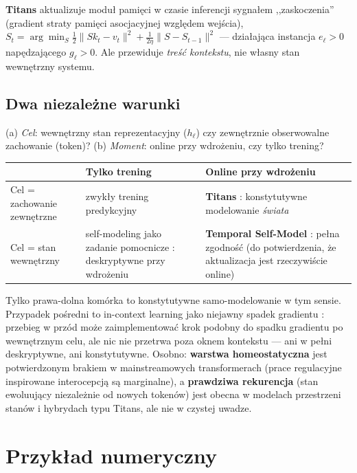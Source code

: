 \documentclass[11pt]{article}
\begin{document}
\textbf{Titans} \cite{behrouz2024} aktualizuje moduł pamięci w czasie inferencji sygnałem ,,zaskoczenia'' (gradient straty pamięci asocjacyjnej względem wejścia), $S_t=\arg\min_S\frac12\|Sk_t-v_t\|^2+\frac1{2\eta}\|S-S_{t-1}\|^2$ --- działająca instancja $e_\ell>0$ napędzającego $g_\ell>0$. Ale przewiduje \emph{treść kontekstu}, nie własny stan wewnętrzny systemu.

\subsection*{Dwa niezależne warunki}
(a) \emph{Cel}: wewnętrzny stan reprezentacyjny ($h_\ell$) czy zewnętrznie obserwowalne zachowanie (token)? (b) \emph{Moment}: online przy wdrożeniu, czy tylko trening?

\begin{center}
\small
\begin{tabular}{@{}>{\raggedright}p{2.6cm}>{\raggedright}p{4.5cm}>{\raggedright\arraybackslash}p{4.5cm}@{}}
\toprule
 & \textbf{Tylko trening} & \textbf{Online przy wdrożeniu} \\
\midrule
Cel = zachowanie zewnętrzne & zwykły trening predykcyjny & \textbf{Titans} \cite{behrouz2024}: konstytutywne modelowanie \emph{świata} \\[4pt]
Cel = stan wewnętrzny & self-modeling jako zadanie pomocnicze \cite{premakumar2026}: deskryptywne przy wdrożeniu & \textbf{Temporal Self-Model} \cite{tsm2026}: pełna zgodność (do potwierdzenia, że aktualizacja jest rzeczywiście online) \\
\bottomrule
\end{tabular}
\end{center}
Tylko prawa-dolna komórka to konstytutywne samo-modelowanie w tym sensie. Przypadek pośredni to in-context learning jako niejawny spadek gradientu \cite{oswald2023}: przebieg w przód może zaimplementować krok podobny do spadku gradientu po wewnętrznym celu, ale nic nie przetrwa poza oknem kontekstu --- ani w pełni deskryptywne, ani konstytutywne. Osobno: \textbf{warstwa homeostatyczna} jest potwierdzonym brakiem w mainstreamowych transformerach (prace regulacyjne inspirowane interocepcją \cite{interoceptive2026} są marginalne), a \textbf{prawdziwa rekurencja} (stan ewoluujący niezależnie od nowych tokenów) jest obecna w modelach przestrzeni stanów i hybrydach typu Titans, ale nie w czystej uwadze.

\section{Przykład numeryczny}\label{sec:example}
\end{document}
